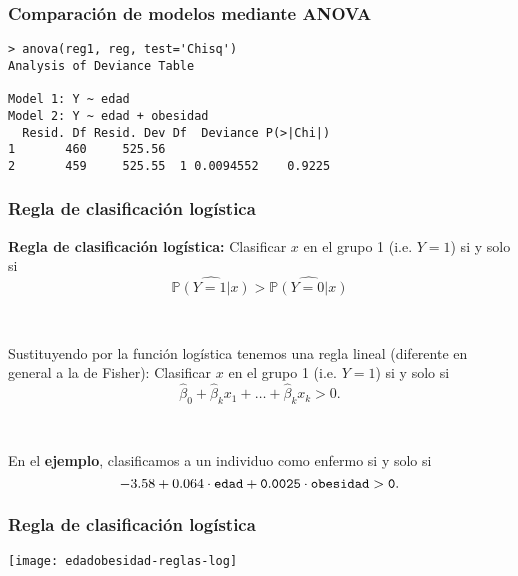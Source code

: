 \documentclass{beamer}
\begin{document}
\begin{frame}
\frametitle{Comparación de modelos mediante ANOVA}

\begin{verbatim}
> anova(reg1, reg, test='Chisq')
Analysis of Deviance Table

Model 1: Y ~ edad
Model 2: Y ~ edad + obesidad
  Resid. Df Resid. Dev Df  Deviance P(>|Chi|)
1       460     525.56                       
2       459     525.55  1 0.0094552    0.9225
\end{verbatim}

\end{frame}
\begin{frame}
\frametitle{Regla de clasificación logística}

\textbf{Regla de clasificación logística: }
Clasificar $x$ en el grupo 1 (i.e. $Y=1$) si y solo si
\[
\widehat{\mathbb{P}(Y=1|x)}>\widehat{\mathbb{P}(Y=0|x)}
\]

\

Sustituyendo por la función logística tenemos una regla lineal (diferente en general a la de Fisher): Clasificar $x$ en el grupo 1 (i.e. $Y=1$) si y solo si
\[
\hat\beta_0 +\hat\beta_k x_1 + \ldots + \hat\beta_k x_k > 0.
\]

\

En el \textbf{ejemplo}, clasificamos a un individuo como enfermo si y solo si
\[
-3.58 + 0.064 \cdot \tt{edad} + 0.0025 \cdot \tt{obesidad} > 0.
\]



\end{frame}
\begin{frame}
\frametitle{Regla de clasificación logística}

\centerline{\texttt{[image: edadobesidad-reglas-log]}}

\end{frame}
\end{document}
